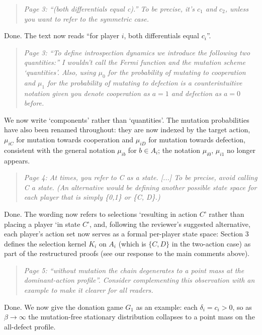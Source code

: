 \documentclass[11pt]{article}
\newenvironment{reviewerquote}
  {\begin{quote}\itshape}
  {\end{quote}}
\begin{document}
\begin{reviewerquote}
Page 3: ``(both differentials equal c).'' To be precise, it's \(c_1\) and
\(c_2\), unless you want to refer to the symmetric case.
\end{reviewerquote}

Done. The text now reads ``for player \(i\), both differentials equal
\(c_i\)''.

\begin{reviewerquote}
Page 3: ``To define introspection dynamics we introduce the following two
quantities:'' I wouldn't call the Fermi function and the mutation scheme
`quantities'. Also, using \(\mu_0\) for the probability of mutating to
cooperation and \(\mu_1\) for the probability of mutating to defection is a
counterintuitive notation given you denote cooperation as \(a=1\) and
defection as \(a=0\) before.
\end{reviewerquote}

We now write `components' rather than `quantities'. The mutation
probabilities have also been renamed throughout: they are now indexed by
the target action, \(\mu_{iC}\) for mutation towards cooperation and
\(\mu_{iD}\) for mutation towards defection, consistent with the general
notation \(\mu_{ib}\) for \(b\in A_i\); the notation \(\mu_{i0}\),
\(\mu_{i1}\) no longer appears.

\begin{reviewerquote}
Page 4: At times, you refer to C as a state. [...] To be precise, avoid
calling C a state. (An alternative would be defining another possible state
space for each player that is simply \{0,1\} or \{C, D\}.)
\end{reviewerquote}

Done. The wording now refers to selections `resulting in action \(C\)' rather
than placing a player `in state \(C\)', and, following the reviewer's
suggested alternative, each player's action set now serves as a formal
per-player state space: Section 3 defines the selection kernel \(K_i\) on
\(A_i\) (which is \(\{C,D\}\) in the two-action case) as part of the
restructured proofs (see our response to the main comments above).

\begin{reviewerquote}
Page 5: ``without mutation the chain degenerates to a point mass at the
dominant-action profile''. Consider complementing this observation with an
example to make it clearer for all readers.
\end{reviewerquote}

Done. We now give the donation game \(G_1\) as an example: each
\(\delta_i=c_i>0\), so as \(\beta\to\infty\) the mutation-free stationary
distribution collapses to a point mass on the all-defect profile.
\end{document}
